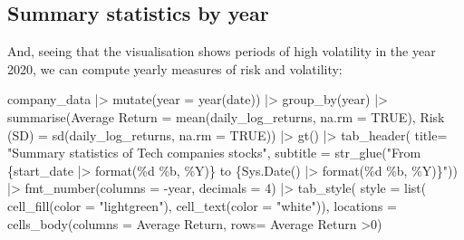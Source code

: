 \documentclass[
  letterpaper,
  DIV=11,
  numbers=noendperiod]{scrreprt}
\newenvironment{Shaded}{\begin{snugshade}}{\end{snugshade}}
\newcommand{\AttributeTok}[1]{\textcolor[rgb]{0.40,0.45,0.13}{#1}}
\newcommand{\ConstantTok}[1]{\textcolor[rgb]{0.56,0.35,0.01}{#1}}
\newcommand{\DecValTok}[1]{\textcolor[rgb]{0.68,0.00,0.00}{#1}}
\newcommand{\FunctionTok}[1]{\textcolor[rgb]{0.28,0.35,0.67}{#1}}
\newcommand{\NormalTok}[1]{\textcolor[rgb]{0.00,0.23,0.31}{#1}}
\newcommand{\OtherTok}[1]{\textcolor[rgb]{0.00,0.23,0.31}{#1}}
\newcommand{\SpecialCharTok}[1]{\textcolor[rgb]{0.37,0.37,0.37}{#1}}
\newcommand{\StringTok}[1]{\textcolor[rgb]{0.13,0.47,0.30}{#1}}
\theoremstyle{definition}
\theoremstyle{remark}
\begin{document}
\subsection{Summary statistics by
year}\label{summary-statistics-by-year}

And, seeing that the visualisation shows periods of high volatility in
the year 2020, we can compute yearly measures of risk and volatility:

\begin{Shaded}
\begin{Highlighting}[]
\NormalTok{company\_data }\SpecialCharTok{|\textgreater{}} 
  \FunctionTok{mutate}\NormalTok{(}\AttributeTok{year =} \FunctionTok{year}\NormalTok{(date)) }\SpecialCharTok{|\textgreater{}} 
  \FunctionTok{group\_by}\NormalTok{(year) }\SpecialCharTok{|\textgreater{}} 
  \FunctionTok{summarise}\NormalTok{(}\StringTok{\textasciigrave{}}\AttributeTok{Average Return}\StringTok{\textasciigrave{}} \OtherTok{=} \FunctionTok{mean}\NormalTok{(daily\_log\_returns, }\AttributeTok{na.rm =} \ConstantTok{TRUE}\NormalTok{), }
            \StringTok{\textasciigrave{}}\AttributeTok{Risk (SD)}\StringTok{\textasciigrave{}} \OtherTok{=} \FunctionTok{sd}\NormalTok{(daily\_log\_returns, }\AttributeTok{na.rm =} \ConstantTok{TRUE}\NormalTok{)) }\SpecialCharTok{|\textgreater{}} 
  \FunctionTok{gt}\NormalTok{() }\SpecialCharTok{|\textgreater{}} 
  \FunctionTok{tab\_header}\NormalTok{(}
    \AttributeTok{title=} \StringTok{"Summary statistics of Tech companies stocks"}\NormalTok{,}
    \AttributeTok{subtitle  =} \FunctionTok{str\_glue}\NormalTok{(}\StringTok{"From \{start\_date |\textgreater{} format(\textquotesingle{}\%d \%b, \%Y\textquotesingle{})\} to \{Sys.Date() |\textgreater{} format(\textquotesingle{}\%d \%b, \%Y\textquotesingle{})\}"}\NormalTok{)) }\SpecialCharTok{|\textgreater{}} 
  \FunctionTok{fmt\_number}\NormalTok{(}\AttributeTok{columns =} \SpecialCharTok{{-}}\NormalTok{year, }\AttributeTok{decimals  =} \DecValTok{4}\NormalTok{) }\SpecialCharTok{|\textgreater{}} 
  \FunctionTok{tab\_style}\NormalTok{(}
    \AttributeTok{style =} \FunctionTok{list}\NormalTok{(}
      \FunctionTok{cell\_fill}\NormalTok{(}\AttributeTok{color =} \StringTok{"lightgreen"}\NormalTok{), }
      \FunctionTok{cell\_text}\NormalTok{(}\AttributeTok{color =} \StringTok{"white"}\NormalTok{)), }
    \AttributeTok{locations =} 
      \FunctionTok{cells\_body}\NormalTok{(}\AttributeTok{columns =} \StringTok{\textasciigrave{}}\AttributeTok{Average Return}\StringTok{\textasciigrave{}}\NormalTok{, }
                 \AttributeTok{rows=} \StringTok{\textasciigrave{}}\AttributeTok{Average Return}\StringTok{\textasciigrave{}} \SpecialCharTok{\textgreater{}}\DecValTok{0}\NormalTok{)}

\end{Highlighting}
\end{Shaded}
\end{document}
